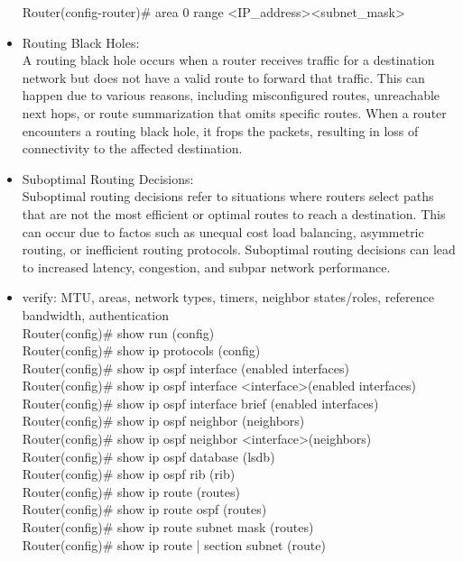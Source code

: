 \documentclass{article}
\begin{document}
\begin{itemize}
  		Router(config-router)\# area 0 range \textless IP\_address\textgreater \textless subnet\_mask\textgreater
  	\item[] Routing Black Holes:\\
  		A routing black hole occurs when a router receives traffic for a destination network but does not have a valid route to forward that traffic. This can happen due to various reasons, including misconfigured routes, unreachable next hops, or route summarization that omits specific routes. When a router encounters a routing black hole, it frops the packets, resulting in loss of connectivity to the affected destination.
  	\item[] Suboptimal Routing Decisions:\\
  		Suboptimal routing decisions refer to situations where routers select paths that are not the most efficient or optimal routes to reach a destination. This can occur due to factos such as unequal cost load balancing, asymmetric routing, or inefficient routing protocols. Suboptimal routing decisions can lead to increased latency, congestion, and subpar network performance.
  		
  	\item[] verify: MTU, areas, network types, timers, neighbor states/roles, reference bandwidth, authentication\\
  		Router(config)\# show run (config)\\
  		Router(config)\# show ip protocols (config)\\
  		
  		Router(config)\# show ip ospf interface (enabled interfaces)\\
  		Router(config)\# show ip ospf interface \textless interface\textgreater (enabled interfaces)\\
  		Router(config)\# show ip ospf interface brief (enabled interfaces)\\
  		
  		Router(config)\# show ip ospf neighbor (neighbors)\\
  		Router(config)\# show ip ospf neighbor \textless interface\textgreater (neighbors)\\
  		
  		Router(config)\# show ip ospf database (lsdb)\\
  		
  		Router(config)\# show ip ospf rib (rib)\\
  		
  		Router(config)\# show ip route (routes)\\
  		Router(config)\# show ip route ospf (routes)\\
  		Router(config)\# show ip route subnet mask (routes)\\
  		Router(config)\# show ip route | section subnet (route)
  

\end{itemize}
\end{document}

